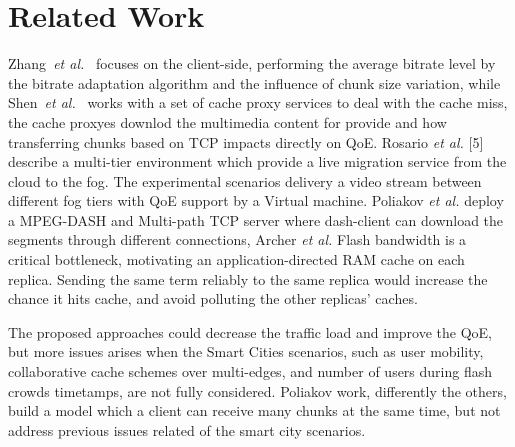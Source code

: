\section*{Related Work}
\label{sec:releated-work}

Zhang~\textit{et al.}~\cite{zhangINFOCOM17} focuses on the client-side, performing the average bitrate level by the bitrate adaptation algorithm and the influence of chunk size variation, while Shen~\textit{et al.}~\cite{shenIWQoS19} works with a set of cache proxy services to deal with the cache miss, the cache proxyes downlod the multimedia content for provide and how transferring chunks based on TCP impacts directly on QoE. Rosario \textit{et al.} [5] describe a multi-tier environment which provide a live migration service from the cloud to the fog. The experimental scenarios delivery a video stream between different fog tiers with QoE support by a Virtual machine.
Poliakov \textit{et al.} deploy a MPEG-DASH and Multi-path TCP server where dash-client can download the segments through different connections, 
Archer \textit{et al.} Flash bandwidth is a critical bottleneck, motivating an application-directed RAM cache on each replica. Sending the same term reliably to the same replica would increase the chance it hits cache, and avoid polluting the other replicas’ caches.

The proposed approaches could decrease the traffic load and improve the QoE, but more issues arises when the Smart Cities scenarios, such as user mobility, collaborative cache schemes over multi-edges, and number of users during flash crowds timetamps, are not fully considered. Poliakov work, differently the others, build a model which a client can receive many chunks at the same time, but not address previous issues related of the smart city scenarios.




